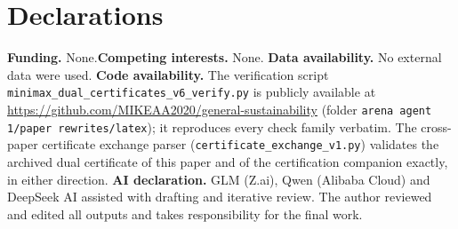 \documentclass[10pt,twocolumn]{article}
\theoremstyle{definition}
\begin{document}
\section*{Declarations}
\textbf{Funding.} None.\quad \textbf{Competing interests.} None.\quad
\textbf{Data availability.} No external data were used.\quad
\textbf{Code availability.} The verification script
\texttt{minimax\_dual\_certificates\_v6\_verify.py} is publicly available
at \url{https://github.com/MIKEAA2020/general-sustainability} (folder
\texttt{arena agent 1/paper rewrites/latex}); it reproduces every check family verbatim. The cross-paper certificate
exchange parser (\texttt{certificate\_exchange\_v1.py}) validates the
archived dual certificate of this paper and of the certification companion
exactly, in either direction.\quad
\textbf{AI declaration.} GLM (Z.ai), Qwen (Alibaba Cloud) and DeepSeek AI
assisted with drafting and iterative review. The author reviewed and
edited all outputs and takes responsibility for the final work.
\end{document}
